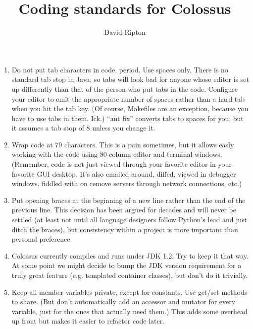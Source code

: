 \documentclass{article}
\begin{document}
\title{Coding standards for Colossus}

\author{David Ripton}

\maketitle

\begin{enumerate}

\item Do not put tab characters in code, period. Use spaces only.
There is no standard tab stop in Java, so tabs will look bad for
anyone whose editor is set up differently than that of the person
who put tabs in the code. Configure your editor to emit the
appropriate number of spaces rather than a hard tab when you hit
the tab key. (Of course, Makefiles are an exception, because
you have to use tabs in them. Ick.) ``ant fix'' converts tabs
to spaces for you, but it assumes a tab stop of 8 unless you
change it.

\item Wrap code at 79 characters. This is a pain sometimes, but it
allows easly working with the code using 80-column editor and
terminal windows. (Remember, code is not just viewed through
your favorite editor in your favorite GUI desktop. It's also
emailed around, diffed, viewed in debugger windows, fiddled with
on remove servers through network connections, etc.)

\item Put opening braces at the beginning of a new line rather than
the end of the previous line. This decision has been argued for
decades and will never be settled (at least not until all language
designers follow Python's lead and just ditch the braces), but
consistency within a project is more important than personal
preference.

\item Colossus currently compiles and runs under JDK 1.2. Try to
keep it that way. At some point we might decide to bump the JDK
version requirement for a truly great feature (e.g. templated
container classes), but don't do it trivially. 

\item Keep all member variables private, except for constants.
Use get/set methods to share. (But don't automatically add 
an accessor and mutator for every variable, just for the ones 
that actually need them.) This adds some overhead up front 
but makes it easier to refactor code later.


\end{enumerate}
\end{document}
